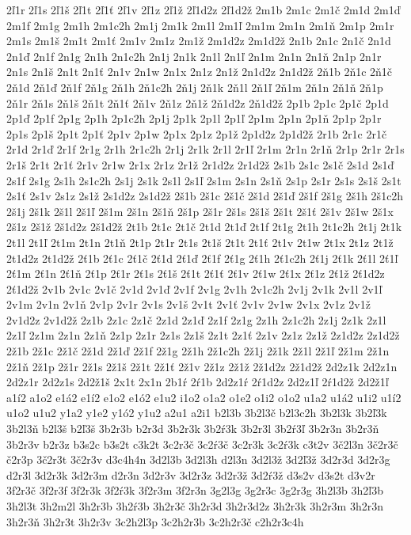 {2ľ1r
2ľ1s
2ľ1š
2ľ1t
2ľ1ť
2ľ1v
2ľ1z
2ľ1ž
2ľ1d2z
2ľ1d2ž
2m1b
2m1c
2m1č
2m1d
2m1ď
2m1f
2m1g
2m1h
2m1c2h
2m1j
2m1k
2m1l
2m1ľ
2m1m
2m1n
2m1ň
2m1p
2m1r
2m1s
2m1š
2m1t
2m1ť
2m1v
2m1z
2m1ž
2m1d2z
2m1d2ž
2n1b
2n1c
2n1č
2n1d
2n1ď
2n1f
2n1g
2n1h
2n1c2h
2n1j
2n1k
2n1l
2n1ľ
2n1m
2n1n
2n1ň
2n1p
2n1r
2n1s
2n1š
2n1t
2n1ť
2n1v
2n1w
2n1x
2n1z
2n1ž
2n1d2z
2n1d2ž
2ň1b
2ň1c
2ň1č
2ň1d
2ň1ď
2ň1f
2ň1g
2ň1h
2ň1c2h
2ň1j
2ň1k
2ň1l
2ň1ľ
2ň1m
2ň1n
2ň1ň
2ň1p
2ň1r
2ň1s
2ň1š
2ň1t
2ň1ť
2ň1v
2ň1z
2ň1ž
2ň1d2z
2ň1d2ž
2p1b
2p1c
2p1č
2p1d
2p1ď
2p1f
2p1g
2p1h
2p1c2h
2p1j
2p1k
2p1l
2p1ľ
2p1m
2p1n
2p1ň
2p1p
2p1r
2p1s
2p1š
2p1t
2p1ť
2p1v
2p1w
2p1x
2p1z
2p1ž
2p1d2z
2p1d2ž
2r1b
2r1c
2r1č
2r1d
2r1ď
2r1f
2r1g
2r1h
2r1c2h
2r1j
2r1k
2r1l
2r1ľ
2r1m
2r1n
2r1ň
2r1p
2r1r
2r1s
2r1š
2r1t
2r1ť
2r1v
2r1w
2r1x
2r1z
2r1ž
2r1d2z
2r1d2ž
2s1b
2s1c
2s1č
2s1d
2s1ď
2s1f
2s1g
2s1h
2s1c2h
2s1j
2s1k
2s1l
2s1ľ
2s1m
2s1n
2s1ň
2s1p
2s1r
2s1s
2s1š
2s1t
2s1ť
2s1v
2s1z
2s1ž
2s1d2z
2s1d2ž
2š1b
2š1c
2š1č
2š1d
2š1ď
2š1f
2š1g
2š1h
2š1c2h
2š1j
2š1k
2š1l
2š1ľ
2š1m
2š1n
2š1ň
2š1p
2š1r
2š1s
2š1š
2š1t
2š1ť
2š1v
2š1w
2š1x
2š1z
2š1ž
2š1d2z
2š1d2ž
2t1b
2t1c
2t1č
2t1d
2t1ď
2t1f
2t1g
2t1h
2t1c2h
2t1j
2t1k
2t1l
2t1ľ
2t1m
2t1n
2t1ň
2t1p
2t1r
2t1s
2t1š
2t1t
2t1ť
2t1v
2t1w
2t1x
2t1z
2t1ž
2t1d2z
2t1d2ž
2ť1b
2ť1c
2ť1č
2ť1d
2ť1ď
2ť1f
2ť1g
2ť1h
2ť1c2h
2ť1j
2ť1k
2ť1l
2ť1ľ
2ť1m
2ť1n
2ť1ň
2ť1p
2ť1r
2ť1s
2ť1š
2ť1t
2ť1ť
2ť1v
2ť1w
2ť1x
2ť1z
2ť1ž
2ť1d2z
2ť1d2ž
2v1b
2v1c
2v1č
2v1d
2v1ď
2v1f
2v1g
2v1h
2v1c2h
2v1j
2v1k
2v1l
2v1ľ
2v1m
2v1n
2v1ň
2v1p
2v1r
2v1s
2v1š
2v1t
2v1ť
2v1v
2v1w
2v1x
2v1z
2v1ž
2v1d2z
2v1d2ž
2z1b
2z1c
2z1č
2z1d
2z1ď
2z1f
2z1g
2z1h
2z1c2h
2z1j
2z1k
2z1l
2z1ľ
2z1m
2z1n
2z1ň
2z1p
2z1r
2z1s
2z1š
2z1t
2z1ť
2z1v
2z1z
2z1ž
2z1d2z
2z1d2ž
2ž1b
2ž1c
2ž1č
2ž1d
2ž1ď
2ž1f
2ž1g
2ž1h
2ž1c2h
2ž1j
2ž1k
2ž1l
2ž1ľ
2ž1m
2ž1n
2ž1ň
2ž1p
2ž1r
2ž1s
2ž1š
2ž1t
2ž1ť
2ž1v
2ž1z
2ž1ž
2ž1d2z
2ž1d2ž
2d2z1k
2d2z1n
2d2z1r
2d2z1s
2d2ž1š
2x1t
2x1n
2b1ŕ
2ŕ1b
2d2z1ŕ
2ŕ1d2z
2d2z1ľ
2ŕ1d2ž
2d2ž1ľ
a1í2
a1o2
e1á2
e1í2
e1o2
e1ó2
e1u2
i1o2
o1a2
o1e2
o1i2
o1o2
u1a2
u1á2
u1i2
u1í2
u1o2
u1u2
y1a2
y1e2
y1ó2
y1u2
a2u1
a2i1
b2l3b
3b2l3č
b2l3c2h
3b2l3k
3b2ľ3k
3b2l3ň
b2l3š
b2ľ3š
3b2r3b
b2r3d
3b2r3k
3b2ŕ3k
3b2r3l
3b2ŕ3ľ
3b2r3n
3b2r3ň
3b2r3v
b2r3z
b3s2c
b3s2t
c3k2t
3c2r3č
3c2ŕ3č
3c2r3k
3c2ŕ3k
c3t2v
3č2l3n
3č2r3č
č2r3p
3č2r3t
3č2r3v
d3c4h4n
3d2l3b
3d2l3h
d2l3n
3d2l3ž
3d2ľ3ž
3d2r3d
3d2r3g
d2r3l
3d2r3k
3d2r3m
d2r3n
3d2r3v
3d2r3z
3d2r3ž
3d2ŕ3ž
d3s2v
d3s2t
d3v2r
3f2r3č
3f2r3f
3f2r3k
3f2ŕ3k
3f2r3m
3f2r3n
3g2l3g
3g2r3c
3g2r3g
3h2l3b
3h2ľ3b
3h2l3t
3h2m2l
3h2r3b
3h2ŕ3b
3h2r3č
3h2r3d
3h2r3d2z
3h2r3k
3h2r3m
3h2r3n
3h2r3ň
3h2r3t
3h2r3v
3c2h2l3p
3c2h2r3b
3c2h2r3č
c2h2r3c4h
}
